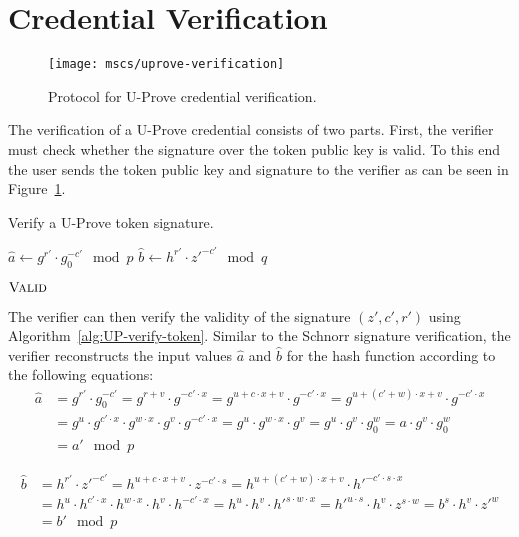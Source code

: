 \section{Credential Verification}\label{sec:UP-verification}

\begin{figure}[ht]
  \centering
  \texttt{[image: mscs/uprove-verification]}
  \caption{Protocol for U-Prove credential verification.}
  \label{msc:uprove-issuance}
\end{figure}

The verification of a U-Prove credential consists of two parts. First, the
verifier must check whether the signature over the token public key is valid. To
this end the user sends the token public key and signature to the verifier as
can be seen in Figure~\ref{msc:uprove-issuance}.
\begin{algorithm}
  \caption{Verify a U-Prove token signature.}
  \label{alg:UP-verify-token}
  \addtolength{\baselineskip}{1mm}
  \begin{algorithmic}[1]
      \State $\hat{a} \gets g^{r'} \cdot g_0^{-c'} \mod p$
      \State $\hat{b} \gets h^{r'} \cdot z'^{-c'} \mod q$
        \Return {}
      \EndIf

      \Return $\Call{Valid}{}$
    \EndFunction
  \end{algorithmic}
\end{algorithm}

The verifier can then verify the validity of the signature $(z', c', r')$ using
Algorithm~\ref{alg:UP-verify-token}. Similar to the Schnorr signature
verification, the verifier reconstructs the input values $\hat{a}$ and
$\hat{b}$ for the hash function according to the following equations:
\begin{align*}
  \hat{a}
  & = g^{r'} \cdot g_0^{-c'}
  = g^{r + v} \cdot g^{-c' \cdot x}
  = g^{u + c \cdot x + v} \cdot g^{-c' \cdot x}
  = g^{u + (c' + w) \cdot x + v} \cdot g^{-c' \cdot x} \\
  & = g^u \cdot g^{c' \cdot x} \cdot g^{w \cdot x} \cdot g^v \cdot g^{-c' \cdot x}
  = g^u \cdot g^{w \cdot x} \cdot g^v
  = g^u \cdot g^v \cdot g_0^w
  = a \cdot g^v \cdot g_0^w \\
  & = a' \mod p
\end{align*}

\begin{align*}
  \hat{b}
  & = h^{r'} \cdot z'^{-c'}
  = h^{u + c \cdot x + v} \cdot z^{-c' \cdot s}
  = h^{u + (c' + w) \cdot x + v} \cdot h'^{-c' \cdot s \cdot x} \\
  & = h^u \cdot h^{c' \cdot x} \cdot h^{w \cdot x} \cdot h^v \cdot h^{-c' \cdot x}
  = h^u \cdot h^v \cdot h'^{s \cdot w \cdot x}
  = h'^{u \cdot s} \cdot h^v \cdot z^{s \cdot w}
  = b^s \cdot h^v \cdot z'^w \\
  & = b' \mod p
\end{align*}

